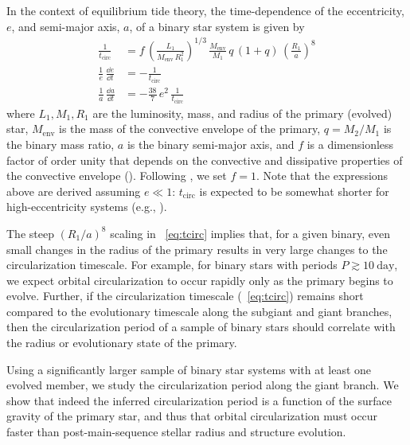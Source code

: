 \documentclass[modern, letterpaper]{aastex62}
\begin{document}
In the context of equilibrium tide theory, the time-dependence of the
eccentricity, $e$, and semi-major axis, $a$, of a binary star system is given by
\begin{align}
    \frac{1}{t_\textrm{circ}} &= f \,
        \left(\frac{L_1}{M_{\textrm{env}} \, R_1^2}\right)^{1/3} \,
        \frac{M_{\textrm{env}}}{M_1} \,
        q \, (1 + q) \,
        \left(\frac{R_1}{a}\right)^8 \label{eq:tcirc}\\
    \frac{1}{e} \, \frac{\dd e}{\dd t} &= - \frac{1}{t_\textrm{circ}}
        \label{eq:dlne} \\
    \frac{1}{a} \, \frac{\dd a}{\dd t} &= - \frac{38}{7} \, e^2 \,
        \frac{1}{t_\textrm{circ}} \label{eq:dlna}
\end{align}
where $L_1, M_1, R_1$ are the luminosity, mass, and radius of the primary
(evolved) star, $M_{\textrm{env}}$ is the mass of the convective envelope of the
primary, $q = M_2 / M_1$ is the binary mass ratio, $a$ is the binary semi-major
axis, and $f$ is a dimensionless factor of order unity that depends on the
convective and dissipative properties of the convective envelope
(\citealt{Zahn:1977, Zahn:1989, Verbunt:1995}).
Following \citet{Verbunt:1995}, we set $f=1$.
Note that the expressions above are derived assuming $e \ll 1$:
$t_\textrm{circ}$ is expected to be somewhat shorter for high-eccentricity
systems (e.g., \citealt{Hut:1981}).

The steep $\left(R_1 / a\right)^8$ scaling in \eqname~\ref{eq:tcirc}
implies that, for a given binary, even small changes in the radius of the
primary results in very large changes to the circularization timescale.
For example, for binary stars with periods $P \gtrsim 10~\textrm{day}$, we
expect orbital circularization to occur rapidly only as the primary begins to
evolve.
Further, if the circularization timescale (\eqname~\ref{eq:tcirc}) remains short
compared to the evolutionary timescale along the subgiant and giant branches,
then the circularization period of a sample of binary stars should correlate
with the radius or evolutionary state of the primary.

Using a significantly larger sample of binary star systems with at least one
evolved member, we study the circularization period along the giant branch.
We show that indeed the inferred circularization period is a function of the
surface gravity of the primary star, and thus that orbital circularization must
occur faster than post-main-sequence stellar radius and structure evolution.

\end{document}
